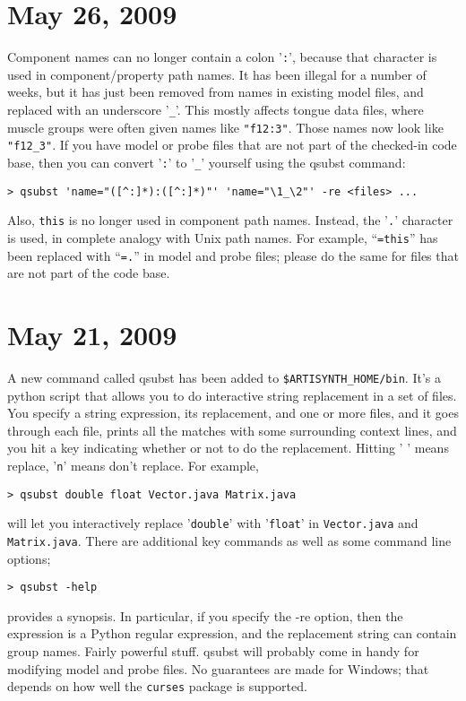 \documentclass{article}
\begin{document}
\section*{May 26, 2009}

Component names can no longer contain a colon '{\tt :}', because that 
character is used in component/property path names. It has been
illegal for a number of weeks, but it has just been removed from names 
in existing model files, and replaced with an underscore '{\tt \_}'.
This mostly affects tongue data files, where muscle groups were often
given names like {\tt "f12:3"}. Those names now look like {\tt "f12\_3"}. If you
have model or probe files that are not part of the checked-in code
base, then you can convert '{\tt :}' to '{\tt \_}' yourself using the qsubst
command: 
%
\begin{verbatim}
> qsubst 'name="([^:]*):([^:]*)"' 'name="\1_\2"' -re <files> ... 
\end{verbatim}
%
Also, {\tt this} is no longer used in component path
names. Instead, the '{\tt .}' character is used, in complete analogy with
Unix path names. For example, ``{\tt =this}'' has been replaced with ``{\tt =.}''
in model and probe files; please do the same for files that are not part
of the code base. 

\section*{May 21, 2009}

A new command called qsubst has been added to
{\tt \$ARTISYNTH\_HOME/bin}. It's a python script that allows you to do
interactive string replacement in a set of files. You specify a string 
expression, its replacement, and one or more files, and it goes
through each file, prints all the matches with some surrounding
context lines, and you hit a key indicating whether or not to do the 
replacement. Hitting ' ' means replace, '{\tt n}' means don't replace. For 
example, 
%
\begin{verbatim}
> qsubst double float Vector.java Matrix.java
\end{verbatim}
%
will let you 
interactively replace '{\tt double}' with '{\tt float}' in {\tt Vector.java} and
{\tt Matrix.java}. There are additional key commands as well as some command 
line options; 
%
\begin{verbatim}
> qsubst -help
\end{verbatim}
%
provides a synopsis. In particular, if
you specify the -re option, then the expression is a Python regular 
expression, and the replacement string can contain group names. Fairly
powerful stuff. qsubst will probably come in handy for modifying model 
and probe files. No guarantees are made for Windows; that depends on
how well the {\tt curses} package is supported. 
\end{document}
